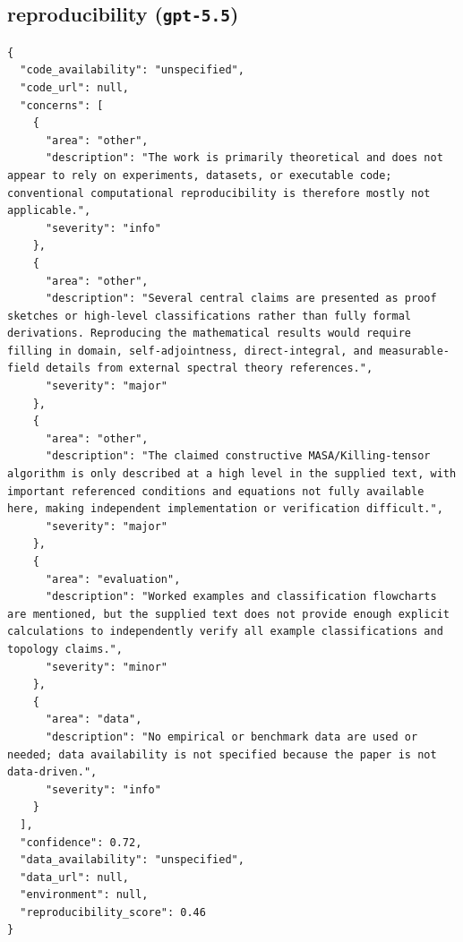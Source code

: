 \documentclass[11pt]{article}
\begin{document}
\subsection*{reproducibility (\texttt{gpt-5.5})}
\begin{verbatim}
{
  "code_availability": "unspecified",
  "code_url": null,
  "concerns": [
    {
      "area": "other",
      "description": "The work is primarily theoretical and does not appear to rely on experiments, datasets, or executable code; conventional computational reproducibility is therefore mostly not applicable.",
      "severity": "info"
    },
    {
      "area": "other",
      "description": "Several central claims are presented as proof sketches or high-level classifications rather than fully formal derivations. Reproducing the mathematical results would require filling in domain, self-adjointness, direct-integral, and measurable-field details from external spectral theory references.",
      "severity": "major"
    },
    {
      "area": "other",
      "description": "The claimed constructive MASA/Killing-tensor algorithm is only described at a high level in the supplied text, with important referenced conditions and equations not fully available here, making independent implementation or verification difficult.",
      "severity": "major"
    },
    {
      "area": "evaluation",
      "description": "Worked examples and classification flowcharts are mentioned, but the supplied text does not provide enough explicit calculations to independently verify all example classifications and topology claims.",
      "severity": "minor"
    },
    {
      "area": "data",
      "description": "No empirical or benchmark data are used or needed; data availability is not specified because the paper is not data-driven.",
      "severity": "info"
    }
  ],
  "confidence": 0.72,
  "data_availability": "unspecified",
  "data_url": null,
  "environment": null,
  "reproducibility_score": 0.46
}
\end{verbatim}
\end{document}
